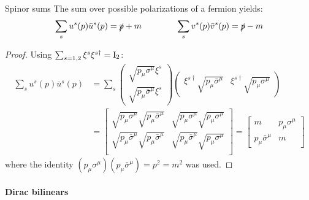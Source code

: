 \begin{proposition}{Spinor sums}{}
  The sum over possible polarizations of a fermion yields:
  \begin{equation}
    \sum_s u^s(p) \bar{u}^s(p) = \slashed{p} + m
    \qquad \qquad
    \sum_s v^s(p) \bar{v}^s(p) = \slashed{p} - m
  \end{equation}
  
  \tcblower

  \begin{proof}
    Using $ \sum_{s = 1,2} \xi^s \xi^{s \dagger} = \mathrm{I}_2 $:
    \begin{equation*}
      \begin{split}
        \sum_s u^s(p) \bar{u}^s(p)
        &= \sum_s
        \begin{pmatrix} \sqrt{p_\mu \sigma^\mu} \xi^s \\ \sqrt{p_\mu \bar{\sigma}^\mu} \xi^s \end{pmatrix}
        \begin{pmatrix} \xi^{s \dagger} \sqrt{p_\mu \bar{\sigma}^\mu} & \xi^{s \dagger} \sqrt{p_\mu \sigma^\mu} \end{pmatrix} \\
        &=
        \begin{bmatrix}
          \sqrt{p_\mu \sigma^\mu} \sqrt{p_\mu \bar{\sigma}^\mu} & \sqrt{p_\mu \sigma^\mu} \sqrt{p_\mu \sigma^\mu} \\
          \sqrt{p_\mu \bar{\sigma}^\mu} \sqrt{p_\mu \bar{\sigma}^\mu} & \sqrt{p_\mu \bar{\sigma}^\mu} \sqrt{p_\mu \sigma^\mu} \\
        \end{bmatrix}
        =
        \begin{bmatrix}
          m & p_\mu \sigma^\mu \\ p_\mu \bar{\sigma}^\mu & m
        \end{bmatrix}
      \end{split}
    \end{equation*}
    where the identity $ (p_\mu \sigma^\mu) (p_\mu \bar{\sigma}^\mu) = p^2 = m^2 $ was used.
  \end{proof}
\end{proposition}

\paragraph{Dirac bilinears}

